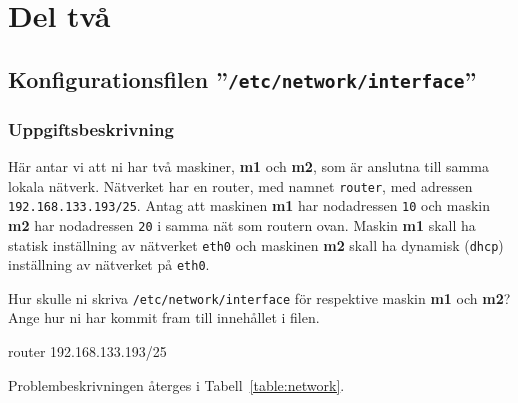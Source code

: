 %
%
%


\section{Del två}


\subsection{Konfigurationsfilen ''\texttt{/etc/network/interface}''}
\subsubsection{Uppgiftsbeskrivning}
Här antar vi att ni har två maskiner, \textbf{m1} och \textbf{m2}, som är
anslutna till samma lokala nätverk.  Nätverket har en router, med namnet
\texttt{router}, med adressen \texttt{192.168.133.193/25}. Antag att maskinen
\textbf{m1} har nodadressen \texttt{10} och maskin \textbf{m2} har nodadressen
\texttt{20} i samma nät som routern ovan. Maskin \textbf{m1} skall ha statisk
inställning av nätverket \texttt{eth0} och maskinen \textbf{m2} skall ha
dynamisk (\texttt{dhcp}) inställning av nätverket på \texttt{eth0}.

Hur skulle ni skriva \texttt{/etc/network/interface} för respektive maskin
\textbf{m1} och \textbf{m2}?  Ange hur ni har kommit fram till innehållet i
filen.

router   192.168.133.193/25

Problembeskrivningen återges i Tabell~\ref{table:network}.

